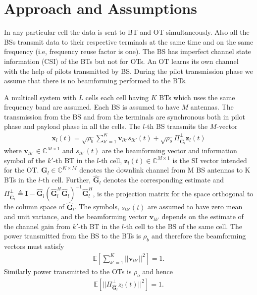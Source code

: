 \documentclass[10pt, a4paper, twoside,fleqn]{article}
\begin{document}
\section{Approach and Assumptions}	
	In any particular cell the data is sent to BT and OT simultaneously. Also all the BSs transmit data to their respective terminals at the same time and on the same frequency (i.e, frequency reuse factor is one). The BS has imperfect channel state information (CSI) of the BTs but not for OTs. An OT learns its own channel with the help of pilots transmitted by BS. During the pilot transmission phase we assume that there is no beamforming performed to the BTs.

	A multicell system with $L$ cells each cell having $K$ BTs which uses the same frequency band are assumed. Each BS is assumed to have $M$ antennas. The transmission from the BS and from the terminals are synchronous both in pilot phase and payload phase in all the cells. The $l$-th BS transmits the $M$-vector
\begin{eqnarray}\label{eqn:txbt}
	\pmb{x}_l(t) = \sqrt{\rho_b}\sum\limits_{k'=1}^{K}\pmb{v}_{lk'}s_{lk'}(t)
    		      + \sqrt{\rho_o}\Pi^{\perp}_{{\pmb{\widehat{G}}_l}}\pmb{z}_l(t)
\end{eqnarray}
where $\pmb{v}_{lk'}\in\mathbb{C}^{M\times 1}$ and $s_{lk'}(t)$ are the beamforming vector and information symbol of the $k'$-th BT in the $l$-th cell, $\pmb{z}_l(t) \in \mathbb{C}^{M\times 1}$  is the SI vector intended for the OT. $\pmb{G}_l \in {\mathbb C}^{K \times M}$ denotes the downlink channel from M BS antennas to K BTs in the $l$-th cell. Further, $\pmb{\widehat{G}}_l$ denotes the corresponding estimate and $\Pi^{\perp}_{{\pmb{\widehat{G}}_l}} \triangleq \pmb{I}-\pmb{\widehat{G}}_l(\pmb{\widehat{G}}_l^H\pmb{\widehat{G}}_l)^{-1}\pmb{\widehat{G}}_l^H$, is the projection matrix for the space orthogonal to the column space of $\pmb{\widehat{G}}_l$. The symbols, $s_{lk'}(t)$ are assumed to have zero mean and unit variance, and the beamforming vector $\pmb{v}_{lk'}$ depends on the estimate of the channel gain from $k'$-th BT in the $l$-th cell to the BS of the same cell. 
The power transmitted from the BS to the BTs is $\rho_b$ and therefore the beamforming vectors must satisfy
\begin{eqnarray}\label{eqn:vkcondtion}
	\mathbb{E}\left[\sum\limits_{k'=1}^{K}||\pmb{v}_{lk'}||^2\right]=1.
\end{eqnarray}
Similarly power transmitted to the OTs is $\rho_o$ and hence
\begin{eqnarray}\label{eqn:zlcondition}
	\mathbb{E}\left[||\Pi^{\perp}_{\pmb{\widehat{G}}_l}z_l(t)||^2\right]=1.
\end{eqnarray}
\end{document}
